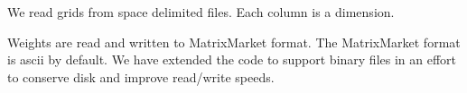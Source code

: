 We read grids from space delimited files. Each column is a dimension.

Weights are read and written to MatrixMarket format. The MatrixMarket format is ascii by default. We have extended the code to support binary files in an effort to conserve disk and improve read/write speeds. 
